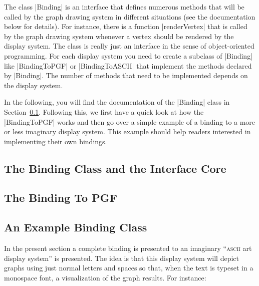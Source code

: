 The class |Binding| is an interface that defines numerous methods that
will be called by the graph drawing system in different situations (see
the documentation below for details). For instance, there is a
function |renderVertex| that is called by the graph drawing system
whenever a vertex should be rendered by the display system. The class
is really just an interface in the sense of object-oriented
programming. For each display system you need to create a subclass of
|Binding| like |BindingToPGF| or |BindingToASCII| that implement the
methods declared by |Binding|. The number of methods that need to be
implemented depends on the display system.

In the following, you will find the documentation of the |Binding|
class in Section~\ref{section-gd-binding-doc}. Following this, we
first have a quick look at how the |BindingToPGF| works and then go
over a simple example of a binding to a more or less imaginary
display system. This example should help readers interested in
implementing their own bindings.


\subsection{The Binding Class and the Interface Core}
\label{section-gd-binding-doc}



\subsection{The Binding To PGF}



\subsection{An Example Binding Class}

\label{section-gd-binding-layer-example}

In the present section a complete binding is presented to an imaginary
``\textsc{ascii} art display system'' is presented. The idea is that
this display system will depict graphs using just normal letters and
spaces so that, when the text is typeset in a monospace font, a
visualization of the graph results. For instance:

